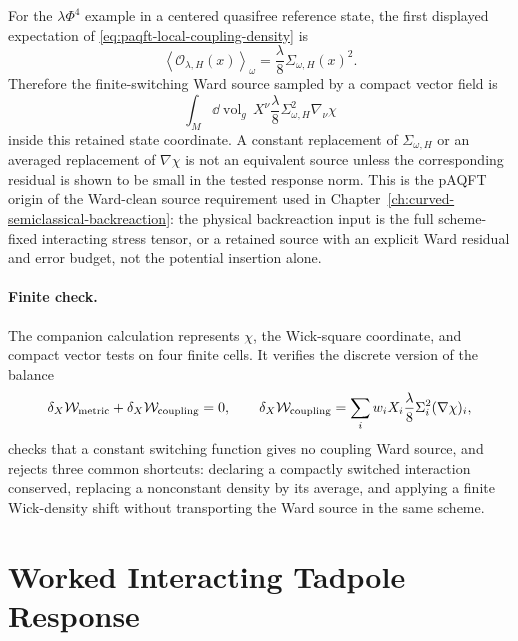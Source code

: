 For the \(\lambda\Phi^4\) example in a centered quasifree reference state,
the first displayed expectation of
\eqref{eq:paqft-local-coupling-density} is
\[
  \left\langle\mathcal O_{\lambda,H}(x)\right\rangle_\omega
  =
  \frac{\lambda}{8}\Sigma_{\omega,H}(x)^2 .
\]
Therefore the finite-switching Ward source sampled by a compact vector field
is
\begin{equation}
  \int_M\dd\operatorname{vol}_g\,
  X^\nu
  \frac{\lambda}{8}\Sigma_{\omega,H}^2\nabla_\nu\chi
  \label{eq:paqft-local-coupling-finite-switch-source}
\end{equation}
inside this retained state coordinate.  A constant replacement of
\(\Sigma_{\omega,H}\) or an averaged replacement of \(\nabla\chi\) is not an
equivalent source unless the corresponding residual is shown to be small in
the tested response norm.  This is the pAQFT origin of the Ward-clean source
requirement used in
Chapter~\ref{ch:curved-semiclassical-backreaction}: the physical
backreaction input is the full scheme-fixed interacting stress tensor, or a
retained source with an explicit Ward residual and error budget, not the
potential insertion alone.

\paragraph{Finite check.}
The companion calculation represents \(\chi\), the Wick-square coordinate,
and compact vector tests on four finite cells.  It verifies the discrete
version of the balance
\[
  \delta_X\mathcal W_{\rm metric}
  +
  \delta_X\mathcal W_{\rm coupling}=0,
  \qquad
  \delta_X\mathcal W_{\rm coupling}
  =
  \sum_i w_iX_i
  \frac{\lambda}{8}\Sigma_i^2(\nabla\chi)_i ,
\]
checks that a constant switching function gives no coupling Ward source, and
rejects three common shortcuts: declaring a compactly switched interaction
conserved, replacing a nonconstant density by its average, and applying a
finite Wick-density shift without transporting the Ward source in the same
scheme.

\section{Worked Interacting Tadpole Response}
\label{sec:paqft-worked-interacting-tadpole-response}

